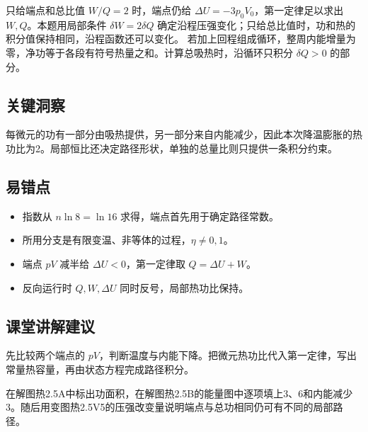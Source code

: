 \documentclass[UTF8,fontset=fandol,a4paper,11pt]{ctexart}
\begin{document}
只给端点和总比值 $W/Q=2$ 时，端点仍给 $\Delta U=-3p_0V_0$，第一定律足以求出 $W,Q$。本题用局部条件 $\delta W=2\delta Q$ 确定沿程压强变化；只给总比值时，功和热的积分值保持相同，沿程函数还可以变化。
若加上回程组成循环，整周内能增量为零，净功等于各段有符号热量之和。计算总吸热时，沿循环只积分 $\delta Q>0$ 的部分。




\subsection*{关键洞察}

每微元的功有一部分由吸热提供，另一部分来自内能减少，因此本次降温膨胀的热功比为2。局部恒比还决定路径形状，单独的总量比则只提供一条积分约束。



\subsection*{易错点}

\begin{itemize}
\item 指数从 $n\ln8=\ln16$ 求得，端点首先用于确定路径常数。
\item 所用分支是有限变温、非等体的过程，$\eta\ne0,1$。
\item 端点 $pV$ 减半给 $\Delta U<0$，第一定律取 $Q=\Delta U+W$。
\item 反向运行时 $Q,W,\Delta U$ 同时反号，局部热功比保持。
\end{itemize}



\subsection*{课堂讲解建议}

先比较两个端点的 $pV$，判断温度与内能下降。把微元热功比代入第一定律，写出常量热容量，再由状态方程完成路径积分。

在解图热2.5A中标出功面积，在解图热2.5B的能量图中逐项填上3、6和内能减少3。随后用变图热2.5V5的压强改变量说明端点与总功相同仍可有不同的局部路径。


\end{document}
